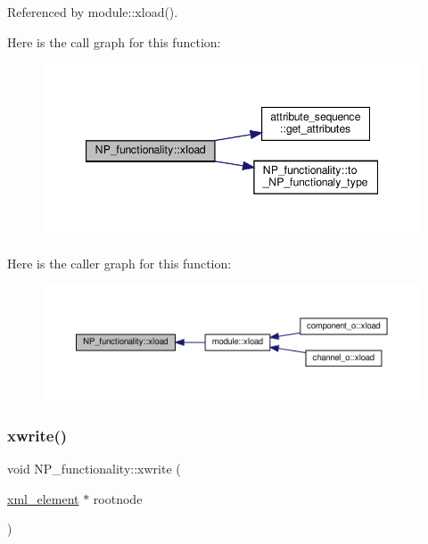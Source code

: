 Referenced by module\+::xload().

Here is the call graph for this function\+:
\nopagebreak
\begin{figure}[H]
\begin{center}
\leavevmode
\includegraphics[width=347pt]{d8/dda/classNP__functionality_a735fea35a9e8c0fa66f447bd5040e84e_cgraph}
\end{center}
\end{figure}
Here is the caller graph for this function\+:
\nopagebreak
\begin{figure}[H]
\begin{center}
\leavevmode
\includegraphics[width=350pt]{d8/dda/classNP__functionality_a735fea35a9e8c0fa66f447bd5040e84e_icgraph}
\end{center}
\end{figure}
\mbox{\label{classNP__functionality_abef0c8beb48664e17a7089af4945d2a2}} 
\subsubsection{\texorpdfstring{xwrite()}{xwrite()}}
{\footnotesize\ttfamily void N\+P\+\_\+functionality\+::xwrite (\begin{DoxyParamCaption}\item[{\hyperlink{classxml__element}{xml\+\_\+element} $\ast$}]{rootnode }\end{DoxyParamCaption})}



